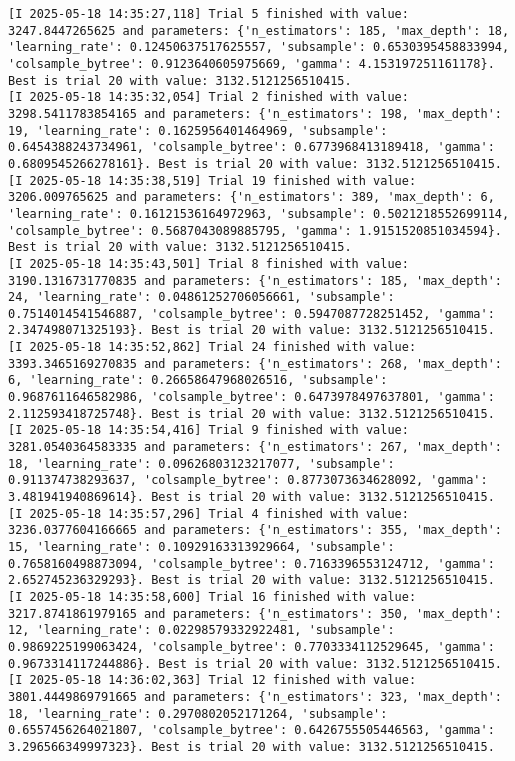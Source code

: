 \documentclass[
  letterpaper,
  DIV=11,
  numbers=noendperiod]{scrreprt}
\begin{document}
\begin{verbatim}
[I 2025-05-18 14:35:27,118] Trial 5 finished with value: 3247.8447265625 and parameters: {'n_estimators': 185, 'max_depth': 18, 'learning_rate': 0.12450637517625557, 'subsample': 0.6530395458833994, 'colsample_bytree': 0.9123640605975669, 'gamma': 4.153197251161178}. Best is trial 20 with value: 3132.5121256510415.
[I 2025-05-18 14:35:32,054] Trial 2 finished with value: 3298.5411783854165 and parameters: {'n_estimators': 198, 'max_depth': 19, 'learning_rate': 0.1625956401464969, 'subsample': 0.6454388243734961, 'colsample_bytree': 0.6773968413189418, 'gamma': 0.6809545266278161}. Best is trial 20 with value: 3132.5121256510415.
[I 2025-05-18 14:35:38,519] Trial 19 finished with value: 3206.009765625 and parameters: {'n_estimators': 389, 'max_depth': 6, 'learning_rate': 0.16121536164972963, 'subsample': 0.5021218552699114, 'colsample_bytree': 0.5687043089885795, 'gamma': 1.9151520851034594}. Best is trial 20 with value: 3132.5121256510415.
[I 2025-05-18 14:35:43,501] Trial 8 finished with value: 3190.1316731770835 and parameters: {'n_estimators': 185, 'max_depth': 24, 'learning_rate': 0.04861252706056661, 'subsample': 0.7514014541546887, 'colsample_bytree': 0.5947087728251452, 'gamma': 2.347498071325193}. Best is trial 20 with value: 3132.5121256510415.
[I 2025-05-18 14:35:52,862] Trial 24 finished with value: 3393.3465169270835 and parameters: {'n_estimators': 268, 'max_depth': 6, 'learning_rate': 0.26658647968026516, 'subsample': 0.9687611646582986, 'colsample_bytree': 0.6473978497637801, 'gamma': 2.112593418725748}. Best is trial 20 with value: 3132.5121256510415.
[I 2025-05-18 14:35:54,416] Trial 9 finished with value: 3281.0540364583335 and parameters: {'n_estimators': 267, 'max_depth': 18, 'learning_rate': 0.09626803123217077, 'subsample': 0.911374738293637, 'colsample_bytree': 0.8773073634628092, 'gamma': 3.481941940869614}. Best is trial 20 with value: 3132.5121256510415.
[I 2025-05-18 14:35:57,296] Trial 4 finished with value: 3236.0377604166665 and parameters: {'n_estimators': 355, 'max_depth': 15, 'learning_rate': 0.10929163313929664, 'subsample': 0.7658160498873094, 'colsample_bytree': 0.7163396553124712, 'gamma': 2.652745236329293}. Best is trial 20 with value: 3132.5121256510415.
[I 2025-05-18 14:35:58,600] Trial 16 finished with value: 3217.8741861979165 and parameters: {'n_estimators': 350, 'max_depth': 12, 'learning_rate': 0.02298579332922481, 'subsample': 0.9869225199063424, 'colsample_bytree': 0.7703334112529645, 'gamma': 0.9673314117244886}. Best is trial 20 with value: 3132.5121256510415.
[I 2025-05-18 14:36:02,363] Trial 12 finished with value: 3801.4449869791665 and parameters: {'n_estimators': 323, 'max_depth': 18, 'learning_rate': 0.2970802052171264, 'subsample': 0.6557456264021807, 'colsample_bytree': 0.6426755505446563, 'gamma': 3.296566349997323}. Best is trial 20 with value: 3132.5121256510415.

\end{verbatim}
\end{document}
